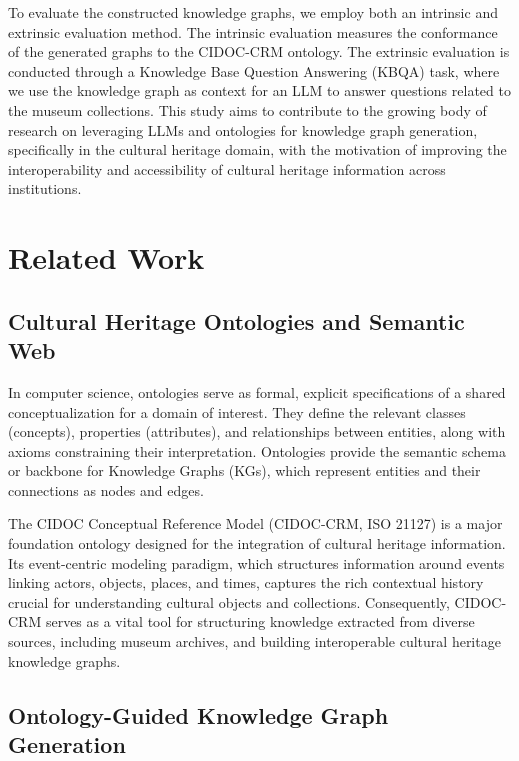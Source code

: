 \documentclass[a4, conference]{IEEEtran}
\begin{document}
To evaluate the constructed knowledge graphs, we employ both an intrinsic and extrinsic evaluation method. The intrinsic evaluation measures the conformance of the generated graphs to the CIDOC-CRM ontology. The extrinsic evaluation is conducted through a Knowledge Base Question Answering (KBQA) task, where we use the knowledge graph as context for an LLM to answer questions related to the museum collections. This study aims to contribute to the growing body of research on leveraging LLMs and ontologies for knowledge graph generation, specifically in the cultural heritage domain, with the motivation of improving the interoperability and accessibility of cultural heritage information across institutions.

\section{Related Work}
\label{sec:related_work}

\subsection{Cultural Heritage Ontologies and Semantic Web}

In computer science, ontologies serve as formal, explicit specifications of a shared conceptualization for a domain of interest. They define the relevant classes (concepts), properties (attributes), and relationships between entities, along with axioms constraining their interpretation. Ontologies provide the semantic schema or backbone for Knowledge Graphs (KGs), which represent entities and their connections as nodes and edges.

The CIDOC Conceptual Reference Model \cite{doerr2005thecidoc} (CIDOC-CRM, ISO 21127) is a major foundation ontology designed for the integration of cultural heritage information. Its event-centric modeling paradigm, which structures information around events linking actors, objects, places, and times, captures the rich contextual history crucial for understanding cultural objects and collections. Consequently, CIDOC-CRM serves as a vital tool for structuring knowledge extracted from diverse sources, including museum archives, and building interoperable cultural heritage knowledge graphs.

\subsection{Ontology-Guided Knowledge Graph Generation}
\end{document}

